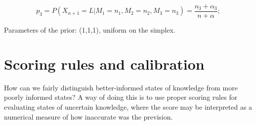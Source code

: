 \documentclass[journal,article,accept,moreauthors,pdftex,12pt,a4paper]{mdpi}
\begin{document}
\[p_3=P(X_{n+1}=L|M_1=n_1,M_2=n_2,M_3=n_3)=\frac{n_3+\alpha_3}{n+\alpha};\]

Parameters of the prior: (1,1,1), uniform on the simplex.

\section{Scoring rules and calibration}
\label{sec::scoring}

How can we fairly distinguish better-informed states of knowledge from more poorly informed states?
A way of doing this is to use proper scoring rules for evaluating states of uncertain knowledge, where 
the score may be interpreted as a numerical measure of how inaccurate was the prevision.



\end{document}
